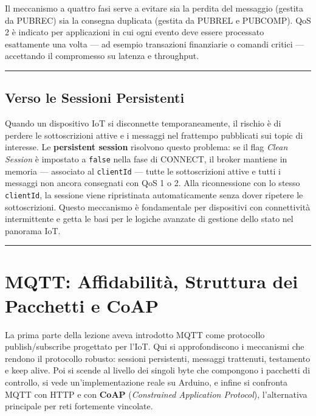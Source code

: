 \documentclass[
  italian,
  openany]{book}
\begin{document}
Il meccanismo a quattro fasi serve a evitare sia la perdita del
messaggio (gestita da PUBREC) sia la consegna duplicata (gestita da
PUBREL e PUBCOMP). QoS 2 è indicato per applicazioni in cui ogni evento
deve essere processato esattamente una volta --- ad esempio transazioni
finanziarie o comandi critici --- accettando il compromesso su latenza e
throughput.

\begin{center}\rule{0.5\linewidth}{0.5pt}\end{center}

\section{Verso le Sessioni
Persistenti}\label{verso-le-sessioni-persistenti}

Quando un dispositivo IoT si disconnette temporaneamente, il rischio è
di perdere le sottoscrizioni attive e i messaggi nel frattempo
pubblicati sui topic di interesse. Le \textbf{persistent session}
risolvono questo problema: se il flag \emph{Clean Session} è impostato a
\texttt{false} nella fase di CONNECT, il broker mantiene in memoria ---
associato al \texttt{clientId} --- tutte le sottoscrizioni attive e
tutti i messaggi non ancora consegnati con QoS 1 o 2. Alla riconnessione
con lo stesso \texttt{clientId}, la sessione viene ripristinata
automaticamente senza dover ripetere le sottoscrizioni. Questo
meccanismo è fondamentale per dispositivi con connettività intermittente
e getta le basi per le logiche avanzate di gestione dello stato nel
panorama IoT.

\begin{center}\rule{0.5\linewidth}{0.5pt}\end{center}

\newpage

\chapter{MQTT: Affidabilità, Struttura dei Pacchetti e
CoAP}\label{mqtt-affidabilituxe0-struttura-dei-pacchetti-e-coap}

La prima parte della lezione aveva introdotto MQTT come protocollo
publish/subscribe progettato per l'IoT. Qui si approfondiscono i
meccanismi che rendono il protocollo robusto: sessioni persistenti,
messaggi trattenuti, testamento e keep alive. Poi si scende al livello
dei singoli byte che compongono i pacchetti di controllo, si vede
un'implementazione reale su Arduino, e infine si confronta MQTT con HTTP
e con \textbf{CoAP} (\emph{Constrained Application Protocol}),
l'alternativa principale per reti fortemente vincolate.
\end{document}
